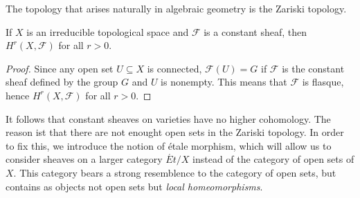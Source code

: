 The topology that arises naturally in algebraic geometry is the Zariski topology.

\begin{theorem}
  If $X$ is an irreducible topological space and $\mathcal{F}$ is a constant sheaf, then $H^r(X, \mathcal{F})$ for all $r>0$.
\end{theorem}
\begin{proof}
  Since any open set $U \subseteq X$ is connected, $\mathcal{F}(U) = G$ if $\mathcal{F}$ is the constant sheaf defined by the group $G$ and $U$ is nonempty. This means that $\mathcal{F}$ is flasque, hence $H^r(X, \mathcal{F})$ for all $r>0$.
\end{proof}
It follows that constant sheaves on varieties have no higher cohomology. The reason ist that there are not enought open sets in the Zariski topology. In order to fix this, we introduce the notion of \'etale morphism, which will allow us to consider sheaves on a larger category $\acute{Et}/X$ instead of the category of open sets of $X$. This category bears a strong resemblence to the category of open sets, but contains as objects not open sets but \textit{local homeomorphisms}.

